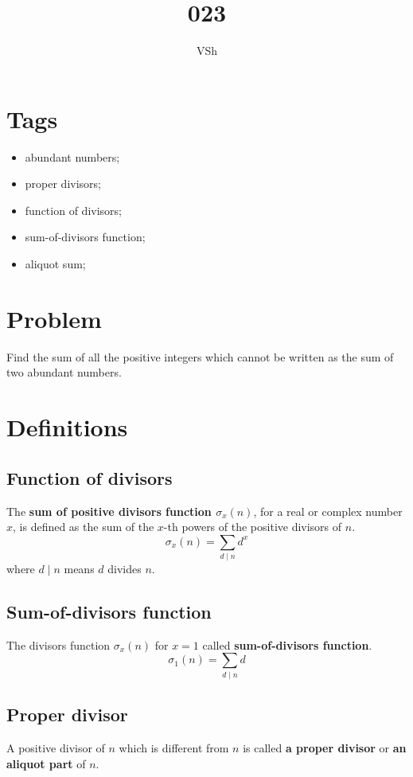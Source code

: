 \documentclass{article}
\begin{document}
\title{023}
\author{VSh}

\maketitle

\section{Tags}
\begin{itemize}
    \item abundant numbers;
    \item proper divisors;
    \item function of divisors;
    \item sum-of-divisors function;
    \item aliquot sum;
\end{itemize}

\section{Problem}
Find the sum of all the positive integers which cannot be written as the sum of 
two abundant numbers.

\section{Definitions}
\subsection{Function of divisors}
The \textbf{sum of positive divisors function $\sigma_{x}(n)$}, for a real or complex number $x$,
is defined as the sum of the $x$-th powers of the positive divisors of $n$.
\begin{equation*}
    \sigma_{x}(n) = \sum_{d \mid n}{d^{x}}
\end{equation*}
where $d \mid n$ means $d$ divides $n$.

\subsection{Sum-of-divisors function}
The divisors function $\sigma_{x}(n)$ for $x=1$ called \textbf{sum-of-divisors function}.
\begin{equation*}
    \sigma_{1}(n) = \sum_{d \mid n}{d}
\end{equation*}

\subsection{Proper divisor}
A positive divisor of $n$ which is different from $n$ is called \textbf{a proper divisor} 
or \textbf{an aliquot part} of $n$.
\end{document}
